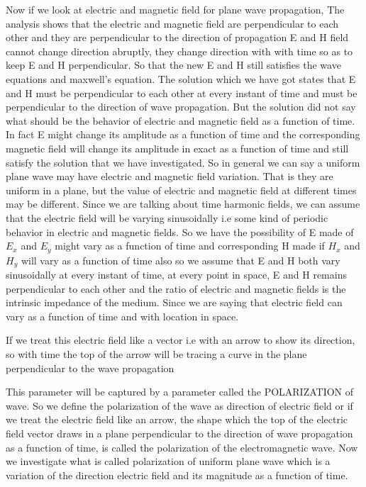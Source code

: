 Now if we look  at electric and magnetic field for plane wave propagation, The analysis shows that the electric and magnetic field are perpendicular to each other and they are perpendicular  to the direction of propagation E and H field cannot  change direction abruptly, they change direction with with time so as to keep E and H perpendicular. So that the new E and H still satisfies the wave equations and maxwell's equation. The solution which we have got states that E and H must be perpendicular to each other at every instant of time and must be perpendicular to the direction of wave propagation. But the solution did not say what should be the behavior of electric and magnetic field as a function of time. In fact E might change its amplitude as a function of time and the corresponding magnetic field will change its amplitude in exact as a function of time and still satisfy the solution that we have investigated. So in general we can say a uniform plane wave may have electric and magnetic field variation. That is they are uniform in a plane, but the value of electric and magnetic field at different times may be different. Since we are talking about time harmonic fields, we can assume that the electric field will be varying sinusoidally i.e some kind of periodic behavior in electric and magnetic fields. So we have the possibility of E made of $E_x$ and $E_y$ might vary as a function of time and corresponding H made if $H_x$ and $H_y$ will vary as a function of time also so we assume that E and H both vary sinusoidally at every instant of time, at every point in space, E and H remains perpendicular to each other and the ratio of electric and magnetic fields is the intrinsic impedance of the medium. Since we are saying that electric field can vary as a function of time and with location in space.

If we treat this electric field like a vector i.e with an arrow to show its direction, so with time the top of the arrow will be tracing a curve in the plane perpendicular to the wave propagation

This parameter will be captured by a parameter called the POLARIZATION of  wave. So we define the polarization of the wave as  direction of  electric field or if we treat the electric field like an arrow, the shape which the top of the electric field vector draws in a plane perpendicular to the direction of wave propagation as a function of time, is called the polarization of the electromagnetic wave. Now we investigate what is called polarization of uniform plane wave which is a variation of the direction electric field and its magnitude as a function of time.


